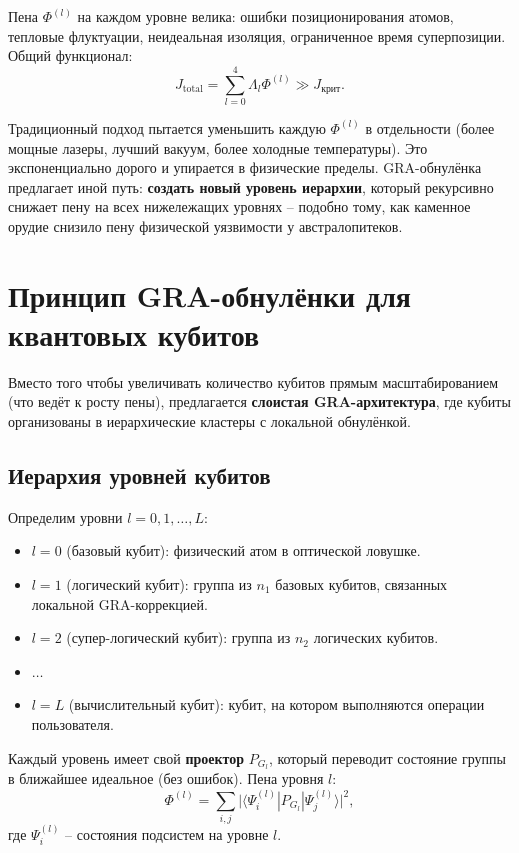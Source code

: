 \documentclass[12pt,a4paper]{article}
\begin{document}
Пена \(\Phi^{(l)}\) на каждом уровне велика: ошибки позиционирования атомов, тепловые флуктуации, неидеальная изоляция, ограниченное время суперпозиции. Общий функционал:
\[
J_{\text{total}} = \sum_{l=0}^{4} \Lambda_l \Phi^{(l)} \gg J_{\text{крит}}.
\]

Традиционный подход пытается уменьшить каждую \(\Phi^{(l)}\) в отдельности (более мощные лазеры, лучший вакуум, более холодные температуры). Это экспоненциально дорого и упирается в физические пределы. GRA-обнулёнка предлагает иной путь: \textbf{создать новый уровень иерархии}, который рекурсивно снижает пену на всех нижележащих уровнях – подобно тому, как каменное орудие снизило пену физической уязвимости у австралопитеков.

\section{Принцип GRA-обнулёнки для квантовых кубитов}

Вместо того чтобы увеличивать количество кубитов прямым масштабированием (что ведёт к росту пены), предлагается \textbf{слоистая GRA-архитектура}, где кубиты организованы в иерархические кластеры с локальной обнулёнкой.

\subsection{Иерархия уровней кубитов}

Определим уровни \(l = 0, 1, \dots, L\):

\begin{itemize}
    \item \(l = 0\) (базовый кубит): физический атом в оптической ловушке.
    \item \(l = 1\) (логический кубит): группа из \(n_1\) базовых кубитов, связанных локальной GRA-коррекцией.
    \item \(l = 2\) (супер-логический кубит): группа из \(n_2\) логических кубитов.
    \item \(\dots\)
    \item \(l = L\) (вычислительный кубит): кубит, на котором выполняются операции пользователя.
\end{itemize}

Каждый уровень имеет свой \textbf{проектор} \(P_{G_l}\), который переводит состояние группы в ближайшее идеальное (без ошибок). Пена уровня \(l\):
\[
\Phi^{(l)} = \sum_{i,j} \bigl| \langle \Psi_i^{(l)} | P_{G_l} | \Psi_j^{(l)} \rangle \bigr|^2,
\]
где \(\Psi_i^{(l)}\) – состояния подсистем на уровне \(l\).
\end{document}
